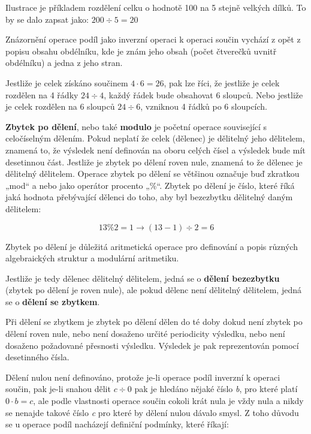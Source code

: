 \vskip 4mm
\centerline{}
\vskip 4mm

Ilustrace je příkladem rozdělení celku o hodnotě 100 na 5 stejně velkých dílků. To by se dalo zapsat jako: $200 \div 5 = 20$

Znázornění operace podíl jako inverzní operaci k operaci součin vychází z opět z popisu obsahu obdélníku, kde je znám jeho obsah (počet čtverečků uvnitř obdélníku) a jedna z jeho stran.

\vskip 4mm
\centerline{}
\vskip 4mm

Jestliže je celek získáno součinem $4\cdot 6 = 26$, pak lze říci, že jestliže je celek rozdělen na 4 řádky $24 \div 4$, každý řádek bude obsahovat 6 sloupců. Nebo jestliže je celek rozdělen na 6 sloupců $24\div 6 $, vzniknou 4 řádků po 6 sloupcích.


{\bf Zbytek po dělení}, nebo také {\bf modulo} je početní operace související s celočíselným dělením. Pokud neplatí že celek (dělenec) je dělitelný jeho dělitelem, znamená to, že výsledek není definován na oboru celých čísel a výsledek bude mít desetinnou část.  Jestliže je zbytek po dělení roven nule, znamená to že dělenec je dělitelný dělitelem.  Operace zbytek po dělení se většinou označuje buď zkratkou „mod“ a nebo jako operátor procento „\%“. Zbytek po dělení je číslo, které říká jaká hodnota přebývající dělenci do toho, aby byl bezezbytku dělitelný daným dělitelem:

$$ 13 \% 2 = 1 \rightarrow (13-1)\div 2 = 6 $$

Zbytek po dělení je důležitá aritmetická operace pro definování a popis různých algebraických struktur a modulární aritmetiku.

Jestliže je tedy dělenec dělitelný dělitelem, jedná se o {\bf dělení bezezbytku} (zbytek po dělení je roven nule), ale pokud dělenc není dělitelný dělitelem, jedná se o {\bf dělení se zbytkem}.

Při dělení se zbytkem je zbytek po dělení dělen do té doby dokud není zbytek po dělení roven nule, nebo není dosaženo určité periodicity výsledku, nebo není dosaženo požadované přesnosti výsledku. Výsledek je pak reprezentován pomocí desetinného čísla.


Dělení nulou není definováno, protože je-li operace podíl inverzní k operaci součin, pak je-li snahou dělit $c\div 0$ pak je hledáno nějaké číslo {\it b}, pro které platí $0 \cdot b = c$, ale podle vlastnosti operace součin cokoli krát nula je vždy nula a nikdy se nenajde takové číslo {\it c} pro které by dělení nulou dávalo smysl. Z toho důvodu se u operace podíl nacházejí definiční podmínky, které říkají:

